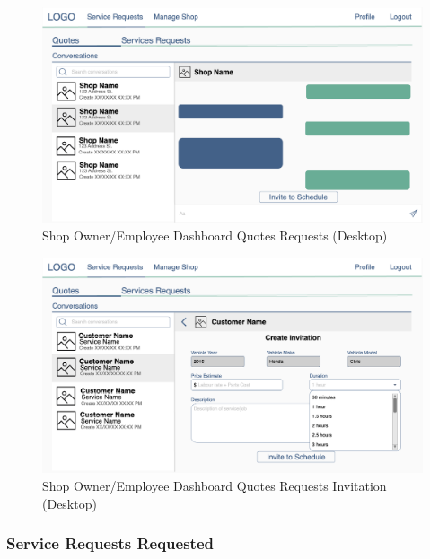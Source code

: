 \documentclass[12pt, titlepage]{article}
\begin{document}
\begin{figure}[H]
	\centering
	\includegraphics[width=\textwidth]{mockups/Shop Owner Dashboard (Quotes Requests) (Desktop).png}
	\caption{Shop Owner/Employee Dashboard \textemdash{} Quotes Requests (Desktop)}
\end{figure}

\begin{figure}[H]
	\centering
	\includegraphics[width=\textwidth]{mockups/Shop Owner Dashboard (Quotes Requests - Invitation) (Desktop).png}
	\caption{Shop Owner/Employee Dashboard \textemdash{} Quotes Requests \textemdash{} Invitation (Desktop)}
\end{figure}

\subsubsection{Service Requests \textemdash{} Requested}
\end{document}
